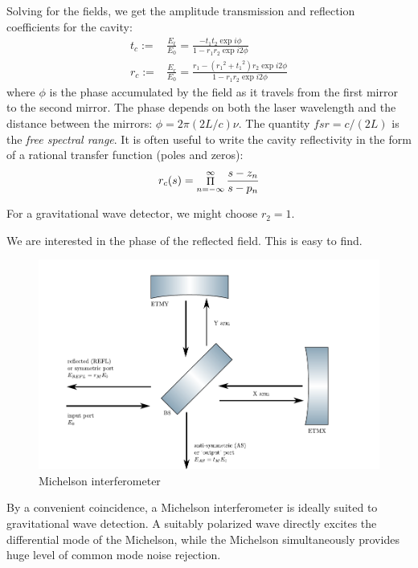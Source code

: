 Solving for the fields, we get the amplitude transmission and
reflection coefficients for the cavity:
%
\begin{align}
t_c := & \frac{E_t}{E_0} = 
         \frac{-t_1 t_2 \exp i\phi}
              {1 - r_1 r_2 \exp i2\phi} \\
r_c := & \frac{E_r}{E_0} = 
         \frac{r_1 - \left({r_1}^2 + {t_1}^2\right)r_2 \exp{i2\phi}}
              {1 - r_1 r_2 \exp i2\phi}
\end{align}
%
where $\phi$ is the phase accumulated by the field as it travels from
the first mirror to the second mirror.  The phase depends on both the
laser wavelength and the distance between the mirrors:
$\phi=2\pi(2L/c)\nu$.  The quantity $fsr=c/(2L)$ is the \emph{free
  spectral range}.  It is often useful to write the cavity
reflectivity in the form of a rational transfer function (poles and
zeros):
%
\begin{equation}
r_c(s) = \mathop{\Huge{\Pi}}\limits_{n=-\infty}^{\infty} \frac {s-z_n} {s-p_n}
\end{equation}

For a gravitational wave detector, we might choose $r_2=1$.

We are interested in the phase of the reflected field.  This is easy to find.

\begin{figure}
\includegraphics{figures/michelson.pdf}
\caption{\label{fig:michelson}Michelson interferometer}
\end{figure}

By a convenient coincidence, a Michelson interferometer is ideally
suited to gravitational wave detection.  A suitably polarized wave
directly excites the differential mode of the Michelson, while the
Michelson simultaneously provides huge level of common mode noise
rejection.


